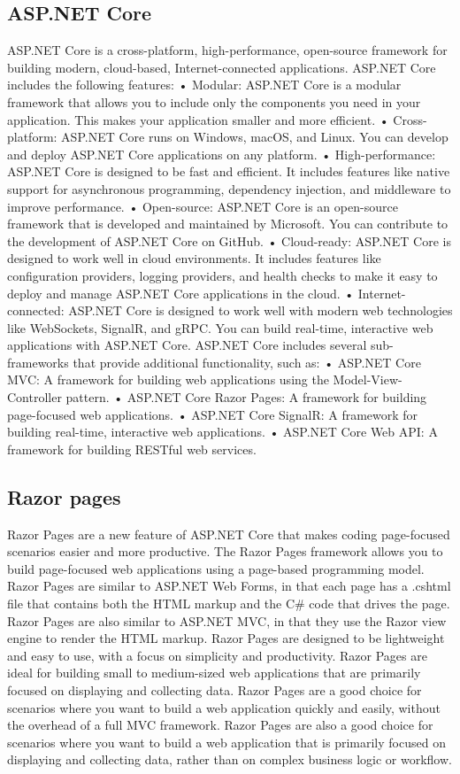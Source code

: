 \subsection{ASP.NET Core}
ASP.NET Core is a cross-platform, high-performance, open-source framework for building modern, cloud-based, Internet-connected applications.
ASP.NET Core includes the following features:
•	Modular: ASP.NET Core is a modular framework that allows you to include only the components you need in your application. This makes your application smaller and more efficient.
•	Cross-platform: ASP.NET Core runs on Windows, macOS, and Linux. You can develop and deploy ASP.NET Core applications on any platform.
•	High-performance: ASP.NET Core is designed to be fast and efficient. It includes features like native support for asynchronous programming, dependency injection, and middleware to improve performance.
•	Open-source: ASP.NET Core is an open-source framework that is developed and maintained by Microsoft. You can contribute to the development of ASP.NET Core on GitHub.
•	Cloud-ready: ASP.NET Core is designed to work well in cloud environments. It includes features like configuration providers, logging providers, and health checks to make it easy to deploy and manage ASP.NET Core applications in the cloud.
•	Internet-connected: ASP.NET Core is designed to work well with modern web technologies like WebSockets, SignalR, and gRPC. You can build real-time, interactive web applications with ASP.NET Core.
ASP.NET Core includes several sub-frameworks that provide additional functionality, such as:
•	ASP.NET Core MVC: A framework for building web applications using the Model-View-Controller pattern.
•	ASP.NET Core Razor Pages: A framework for building page-focused web applications.
•	ASP.NET Core SignalR: A framework for building real-time, interactive web applications.
•	ASP.NET Core Web API: A framework for building RESTful web services.

\subsection{Razor pages}
Razor Pages are a new feature of ASP.NET Core that makes coding page-focused scenarios easier and more productive.
The Razor Pages framework allows you to build page-focused web applications using a page-based programming model.
Razor Pages are similar to ASP.NET Web Forms, in that each page has a .cshtml file that contains both the HTML markup and the C\# code that drives the page.
Razor Pages are also similar to ASP.NET MVC, in that they use the Razor view engine to render the HTML markup.
Razor Pages are designed to be lightweight and easy to use, with a focus on simplicity and productivity.
Razor Pages are ideal for building small to medium-sized web applications that are primarily focused on displaying and collecting data.
Razor Pages are a good choice for scenarios where you want to build a web application quickly and easily, without the overhead of a full MVC framework.
Razor Pages are also a good choice for scenarios where you want to build a web application that is primarily focused on displaying and collecting data, rather than on complex business logic or workflow.

